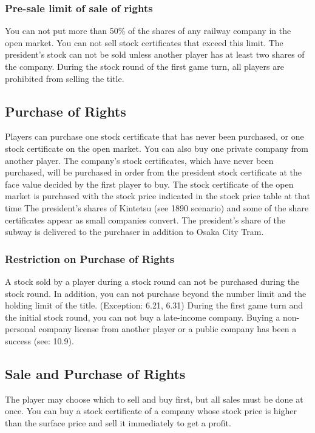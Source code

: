 \documentclass{article}
\begin{document}
\begin{CJK}{UTF8}{min}
\subsubsection{Pre-sale limit of sale of rights}
You can not put more than 50\% of the shares of any railway company in
the open market. You can not sell stock certificates that exceed this
limit. The president's stock can not be sold unless another player has
at least two shares of the company. During the stock round of the
first game turn, all players are prohibited from selling the title.

\subsection{Purchase of Rights}
Players can purchase one stock certificate that has never been
purchased, or one stock certificate on the open market. You can also
buy one private company from another player.  The company's stock
certificates, which have never been purchased, will be purchased in
order from the president stock certificate at the face value decided
by the first player to buy. The stock certificate of the open market
is purchased with the stock price indicated in the stock price table
at that time The president's shares of Kintetsu (see 1890 scenario)
and some of the share certificates appear as small companies
convert. The president's share of the subway is delivered to the
purchaser in addition to Osaka City Tram.

\subsubsection{Restriction on Purchase of Rights}
A stock sold by a player during a stock round can not be purchased
during the stock round. In addition, you can not purchase beyond the
number limit and the holding limit of the title. (Exception: 6.21,
6.31) During the first game turn and the initial stock round, you can
not buy a late-income company.  Buying a non-personal company license
from another player or a public company has been a success (see:
10.9).

\subsection{Sale and Purchase of Rights}
The player may choose which to sell and buy first, but all sales must
be done at once.  You can buy a stock certificate of a company whose
stock price is higher than the surface price and sell it immediately
to get a profit.


\end{CJK}
\end{document}

